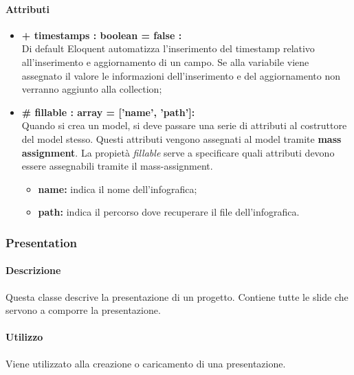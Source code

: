 	\paragraph{Attributi}
		\begin{itemize}
			\item \textbf{+ timestamps : boolean = false :}\\
			Di default Eloquent automatizza l'inserimento del timestamp relativo all'inserimento e aggiornamento di un campo. Se alla variabile viene assegnato il valore le informazioni dell'inserimento e del aggiornamento non verranno aggiunto alla collection;
			\item \textbf{\# fillable : array = [’name’, ’path’]:}\\
			Quando si crea un model, si deve passare una serie di attributi al costruttore del model stesso. Questi attributi vengono assegnati al model tramite \textbf{mass assignment}. La propietà \textit{fillable} serve a specificare quali attributi devono essere assegnabili tramite il mass-assignment.
			\begin{itemize}
				\item \textbf{name:} indica il nome dell'infografica;
				\item \textbf{path:} indica il percorso dove recuperare il file dell'infografica.
			\end{itemize}
		\end{itemize}
\newpage


\subsubsection{Presentation}


	\paragraph{Descrizione}
	Questa classe descrive la presentazione di un progetto. Contiene tutte le slide che servono a comporre la presentazione.

	\paragraph{Utilizzo}
	Viene utilizzato alla creazione o caricamento di una presentazione.
	
